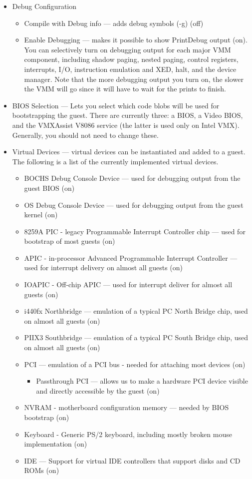\documentclass[11pt]{article}
\begin{document}
\begin{itemize}
\item Debug Configuration
\begin{itemize}
\item Compile with Debug info --- adds debug symbols (-g)  (off)
\item Enable Debugging --- makes it possible to show PrintDebug output
(on).   You can selectively turn on debugging output for each major
VMM component, including shadow paging, nested paging, control
registers, interrupts, I/O, instruction emulation and XED, halt, and
the device manager.   Note that the more debugging output you turn on,
the slower the VMM will go since it will have to wait for the prints
to finish. 
\end{itemize}
\item BIOS Selection --- Lets you select which code blobs will be
used for bootstrapping the guest.   There are currently three:  a
BIOS, a Video BIOS, and the VMXAssist V8086 service (the latter is used only on
Intel VMX).   Generally, you should not need to change these.
\item Virtual Devices --- virtual devices can be instantiated and
added to a guest.   The following is a list of the currently
implemented virtual devices.
\begin{itemize}
\item BOCHS Debug Console Device --- used for debugging output from
the guest BIOS (on)
\item OS Debug Console Device --- used for debugging output from
the guest kernel (on)
\item 8259A PIC - legacy Programmable Interrupt Controller chip --- used
for bootstrap of most guests (on)
\item APIC - in-processor Advanced Programmable Interrupt Controller --- used
for interrupt delivery on almost all guests (on)
\item IOAPIC - Off-chip APIC  --- used for interrupt deliver for almost
all guests (on)
\item i440fx Northbridge --- emulation of a typical PC North Bridge
chip, used on almost all guests (on)
\item PIIX3 Southbridge --- emulation of a typical PC South Bridge
chip, used on almost all guests (on)
\item PCI --- emulation of a PCI bus - needed for attaching most
devices (on)   
\begin{itemize}
\item Passthrough PCI --- allows us to make a hardware PCI device visible and
directly accessible by the guest (on)
\end{itemize}
\item NVRAM - motherboard configuration memory --- needed by BIOS bootstrap (on)
\item Keyboard - Generic PS/2 keyboard, including mostly broken mouse
implementation (on)
\item IDE --- Support for virtual IDE controllers that support disks
and CD ROMs (on)


\end{itemize}
\end{itemize}
\end{document}
